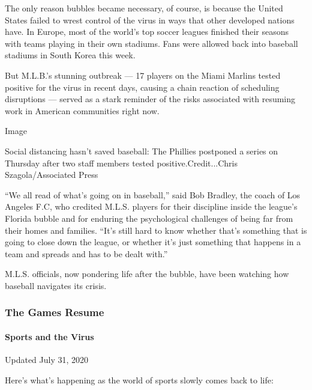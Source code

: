 The only reason bubbles became necessary, of course, is because the
United States failed to wrest control of the virus in ways that other
developed nations have. In Europe, most of the world's top soccer
leagues finished their seasons with teams playing in their own stadiums.
Fans were allowed back into baseball stadiums in South Korea this week.

But M.L.B.'s stunning outbreak --- 17 players on the Miami Marlins
tested positive for the virus in recent days, causing a chain reaction
of scheduling disruptions --- served as a stark reminder of the risks
associated with resuming work in American communities right now.

Image

Social distancing hasn't saved baseball: The Phillies postponed a series
on Thursday after two staff members tested positive.Credit...Chris
Szagola/Associated Press

``We all read of what's going on in baseball,'' said Bob Bradley, the
coach of Los Angeles F.C, who credited M.L.S. players for their
discipline inside the league's Florida bubble and for enduring the
psychological challenges of being far from their homes and families.
``It's still hard to know whether that's something that is going to
close down the league, or whether it's just something that happens in a
team and spreads and has to be dealt with.''

M.L.S. officials, now pondering life after the bubble, have been
watching how baseball navigates its crisis.

\hypertarget{the-games-resume}{%
\subsubsection{The Games Resume}\label{the-games-resume}}

\hypertarget{sports-and-the-virus}{%
\paragraph{Sports and the Virus}\label{sports-and-the-virus}}

Updated July 31, 2020

Here's what's happening as the world of sports slowly comes back to
life:

